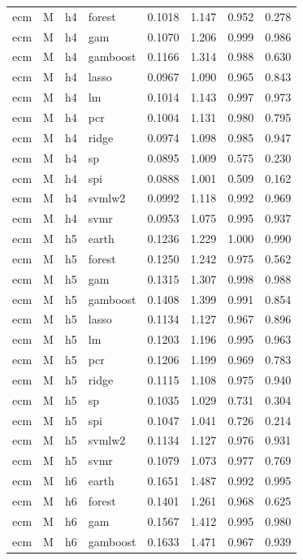\begin{ThreePartTable}
\begin{longtable}[t]{llclcccc}
ecm & M & h4 & forest & 0.1018 & 1.147 & 0.952 & 0.278\\
ecm & M & h4 & gam & 0.1070 & 1.206 & 0.999 & 0.986\\
ecm & M & h4 & gamboost & 0.1166 & 1.314 & 0.988 & 0.630\\
ecm & M & h4 & lasso & 0.0967 & 1.090 & 0.965 & 0.843\\
ecm & M & h4 & lm & 0.1014 & 1.143 & 0.997 & 0.973\\
ecm & M & h4 & pcr & 0.1004 & 1.131 & 0.980 & 0.795\\
ecm & M & h4 & ridge & 0.0974 & 1.098 & 0.985 & 0.947\\
ecm & M & h4 & sp & 0.0895 & 1.009 & 0.575 & 0.230\\
ecm & M & h4 & spi & 0.0888 & 1.001 & 0.509 & 0.162\\
ecm & M & h4 & svmlw2 & 0.0992 & 1.118 & 0.992 & 0.969\\
ecm & M & h4 & svmr & 0.0953 & 1.075 & 0.995 & 0.937\\
\addlinespace
ecm & M & h5 & earth & 0.1236 & 1.229 & 1.000 & 0.990\\
ecm & M & h5 & forest & 0.1250 & 1.242 & 0.975 & 0.562\\
ecm & M & h5 & gam & 0.1315 & 1.307 & 0.998 & 0.988\\
ecm & M & h5 & gamboost & 0.1408 & 1.399 & 0.991 & 0.854\\
ecm & M & h5 & lasso & 0.1134 & 1.127 & 0.967 & 0.896\\
ecm & M & h5 & lm & 0.1203 & 1.196 & 0.995 & 0.963\\
ecm & M & h5 & pcr & 0.1206 & 1.199 & 0.969 & 0.783\\
ecm & M & h5 & ridge & 0.1115 & 1.108 & 0.975 & 0.940\\
ecm & M & h5 & sp & 0.1035 & 1.029 & 0.731 & 0.304\\
ecm & M & h5 & spi & 0.1047 & 1.041 & 0.726 & 0.214\\
ecm & M & h5 & svmlw2 & 0.1134 & 1.127 & 0.976 & 0.931\\
ecm & M & h5 & svmr & 0.1079 & 1.073 & 0.977 & 0.769\\
\addlinespace
ecm & M & h6 & earth & 0.1651 & 1.487 & 0.992 & 0.995\\
ecm & M & h6 & forest & 0.1401 & 1.261 & 0.968 & 0.625\\
ecm & M & h6 & gam & 0.1567 & 1.412 & 0.995 & 0.980\\
ecm & M & h6 & gamboost & 0.1633 & 1.471 & 0.967 & 0.939\\

\end{longtable}
\end{ThreePartTable}
